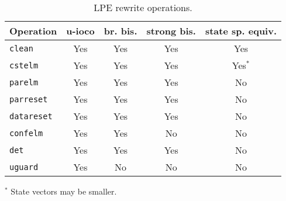 \begin{table}[!ht]
\begin{center}
\begin{tabularx}{\linewidth}{X|c|c|c|c|}
\textbf{Operation} & \textbf{u-ioco} & \textbf{br. bis.} & \textbf{strong bis.} & \textbf{state sp. equiv.} \\ \hline
\texttt{clean} & Yes & Yes & Yes & Yes \\ \hline
\texttt{cstelm} & Yes & Yes & Yes & Yes$^{*}$ \\ \hline
\texttt{parelm} & Yes & Yes & Yes & No \\ \hline
\texttt{parreset} & Yes & Yes & Yes & No \\ \hline
\texttt{datareset} & Yes & Yes & Yes & No \\ \hline
\texttt{confelm} & Yes & Yes & No & No \\ \hline
\texttt{det} & Yes & Yes & Yes & No \\ \hline
\texttt{uguard} & Yes & No & No & No \\ \hline
\end{tabularx}
\caption{LPE rewrite operations.}
$^{*}$ State vectors may be smaller.
\label{lperewriteopsprops:table}
\end{center}
\end{table}




